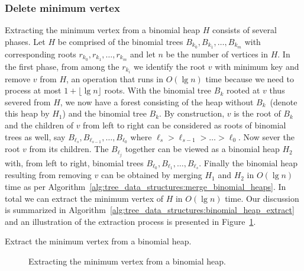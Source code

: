 
\subsubsection{Delete minimum vertex}

Extracting the minimum vertex from a binomial heap $H$ consists of
several phases. Let $H$ be comprised of the binomial trees
$B_{k_0}, B_{k_1}, \dots, B_{k_m}$ with corresponding roots
$r_{k_0}, r_{k_1}, \dots, r_{k_m}$ and let $n$ be the number of
vertices in $H$. In the first phase, from among the $r_{k_i}$ we
identify the root $v$ with minimum key and remove $v$ from $H$, an
operation that runs in $O(\lg n)$ time because we need to process at
most $1 + \lfloor \lg n \rfloor$ roots. With the binomial tree $B_k$
rooted at $v$ thus severed from $H$, we now have a forest consisting
of the heap without $B_k$~(denote this heap by $H_1$) and the binomial
tree $B_k$. By construction, $v$ is the root of $B_k$ and the children
of $v$ from left to right can be considered as roots of binomial trees
as well, say $B_{\ell_s}, B_{\ell_{s-1}}, \dots, B_{\ell_0}$ where
$\ell_s > \ell_{s-1} > \dots > \ell_0$. Now sever the root $v$ from
its children. The $B_{\ell_j}$ together can be viewed as a binomial
heap $H_2$ with, from left to right, binomial trees
$B_{\ell_0}, B_{\ell_1}, \dots, B_{\ell_s}$. Finally the binomial heap
resulting from removing $v$ can be obtained by merging $H_1$ and $H_2$
in $O(\lg n)$ time as per
Algorithm~\ref{alg:tree_data_structures:merge_binomial_heaps}. In
total we can extract the minimum vertex of $H$ in $O(\lg n)$ time. Our
discussion is summarized in
Algorithm~\ref{alg:tree_data_structures:binomial_heap_extract} and an
illustration of the extraction process is presented in
Figure~\ref{fig:tree_data_structures:binomial_heap_extract}.

\begin{algorithm}[!htbp]

\caption{Extract the minimum vertex from a binomial heap.}
\label{alg:tree_data_structures:binomial_heap_extract}
\end{algorithm}

\begin{figure}[!htbp]
\centering

\caption{Extracting the minimum vertex from a binomial heap.}
\label{fig:tree_data_structures:binomial_heap_extract}
\end{figure}


